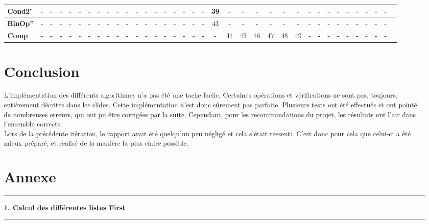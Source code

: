 \documentclass[pdftex,10pt,a4paper]{article}
\begin{document}
\begin{center}
\begin{landscape}
{\begin{tabular}{|l|c|c|c|c|c|c|c|c|c|c|c|c|c|c|c|c|c|c|c|c|c|c|c|c|c|c|c|c|c|c|c|c|c|c|c|}
			 \textbf{Cond2'} &- & - & - & - & - & - & - & - & - & - & - & - & - & - & - & - & - & - & 39 & - & - & - & - & - & - & - & - & - & - & - & - & - & - & - \\ \hline
			 \textbf{BinOp''} &- & - & - & - & - & - & - & - & - & - & - & - & - & - & - & - & - & - & 43 & - & - & - & - & - & - & - & - & - & - & - & - & - & - & - \\ \hline
			 \textbf{Comp} &- & - & - & - & - & - & - & - & - & - & - & - & - & - & - & - & - & - & - & 44 & 45 & 46 & 47 & 48 & 49 & - & - & - & - & - & - & - & - & - \\ \hline
		\end{tabular}
	}
	\end{landscape}
\end{center}

\section{Conclusion}

L'implémentation des différents algorithmes n'a pas été une tache facile. Certaines opérations et vérifications ne sont pas, toujours, entièrement décrites dans les slides. Cette implémentation n'est donc sûrement pas parfaite. Plusieurs tests ont été effectués et ont pointé de nombreuses erreurs, qui ont pu être corrigées par la suite. Cependant, pour les recommandations du projet, les résultats ont l'air dans l'ensemble corrects.\\

Lors de la précédente itération, le rapport avait été quelqu'un peu négligé et cela s'était ressenti. C'est donc pour cela que celui-ci a été mieux préparé, et realisé de la manière la plus claire possible.

\section{Annexe}


\noindent\rule[0.5ex]{\linewidth}{1pt}
\textbf{1. Calcul des différentes listes First}\\
\noindent\rule[0.5ex]{\linewidth}{1pt}
\end{document}
